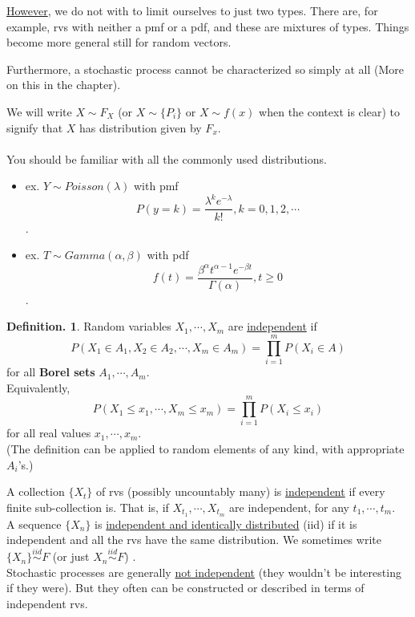 \documentclass[12pt]{article}
\theoremstyle{definition}
\newtheorem{mydef}{Definition.}[section]
\theoremstyle{plain}
\begin{document}
\underline{However}, we do not with to limit ourselves to just two types. There are, for example, rvs with neither a pmf or a pdf, and these are mixtures of types. Things become more general still for random vectors. 

Furthermore, a stochastic process cannot be characterized so simply at all (More on this in the  chapter). 

We will write $X \sim F_X$ (or $X \sim \{P_i\}$ or $X \sim f(x)$ when the context is clear) to signify that $X$ has distribution given by $F_x$. \\
\\
You should be familiar with all the commonly used distributions.
\begin{itemize}
\item ex. $Y \sim Poisson(\lambda)$ with pmf \[P(y = k) = \frac{\lambda ^k e^{- \lambda}}{k!}, k = 0, 1, 2, \cdots\].
\item ex. $T \sim Gamma(\alpha, \beta)$ with pdf \[f(t) = \frac{\beta ^ \alpha t^{\alpha - 1}e^{-\beta t}}{\Gamma (\alpha)}, t \geq 0\].
\end{itemize}

\begin{mydef}
Random variables $X_1, \cdots, X_m$ are \underline{independent} if \[P(X_1 \in A_1, X_2 \in A_2, \cdots, X_m \in A_m) = \prod_{i=1}^m P(X_i \in A)\] for all \textbf{Borel sets} $A_1, \cdots, A_m$. \\
Equivalently, \[P(X_1 \leq x_1, \cdots, X_m \leq x_m) = \prod_{i=1}^m P(X_i \leq x_i)\] for all real values $x_1, \cdots, x_m$. \\
(The  definition can be applied to random elements of any kind, with appropriate $A_i$'s.)
\end{mydef}

A collection $\{X_t\}$ of rvs (possibly uncountably many) is \underline{independent} if every finite sub-collection is. That is, if $X_{t_1}, \cdots, X_{t_m}$ are independent, for any $t_1, \cdots, t_m$. \\ 

A sequence $\{X_n\}$ is \underline{independent and identically distributed} (iid) if it is independent and all the rvs have the same distribution. We sometimes write $\{X_n\} \stackrel{iid}{\sim} F$ (or just $X_n \stackrel{iid}{\sim} F$) . \\ 

Stochastic processes are generally \underline{not independent} (they wouldn't be interesting if they were). But they often can be constructed or described in terms of independent rvs. \\ 
\end{document}
